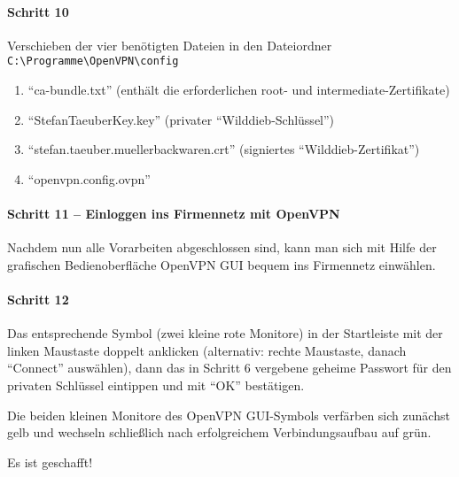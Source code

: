 \paragraph{Schritt 10}

Verschieben der vier benötigten Dateien in den Dateiordner
\lstinline{C:\Programme\OpenVPN\config}

\begin{enumerate}
  \item ``ca-bundle.txt'' (enthält die erforderlichen root- und intermediate-Zertifikate)
  \item ``StefanTaeuberKey.key'' (privater ``Wilddieb-Schlüssel'')
  \item ``stefan.taeuber.muellerbackwaren.crt'' (signiertes ``Wilddieb-Zertifikat'')
  \item ``openvpn.config.ovpn''
\end{enumerate}

\paragraph{Schritt 11 -- Einloggen ins Firmennetz mit OpenVPN}

Nachdem nun alle Vorarbeiten abgeschlossen sind, kann man sich mit Hilfe der
grafischen Bedienoberfläche OpenVPN GUI bequem ins Firmennetz einwählen.

\paragraph{Schritt 12}

Das entsprechende Symbol (zwei kleine rote Monitore) in der Startleiste mit der
linken Maustaste doppelt anklicken (alternativ: rechte Maustaste, danach
``Connect'' auswählen), dann das in Schritt 6 vergebene geheime Passwort für den
privaten Schlüssel eintippen und mit ``OK'' bestätigen.

Die beiden kleinen Monitore des OpenVPN GUI-Symbols verfärben sich zunächst gelb
und wechseln schließlich nach erfolgreichem Verbindungsaufbau auf grün.

Es ist geschafft!

